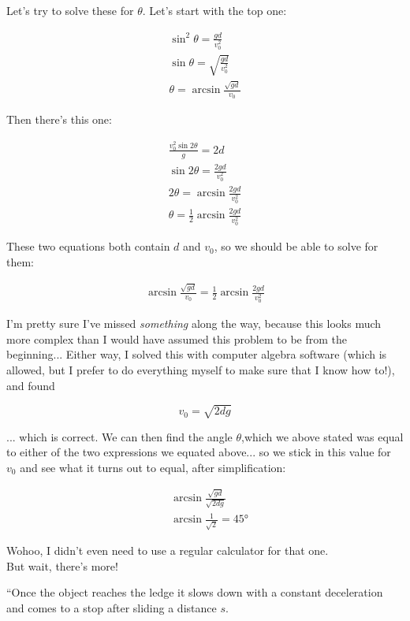\documentclass[8.01x]{subfiles}
\begin{document}
Let's try to solve these for $\theta$. Let's start with the top one:

\begin{align}
\sin^2 \theta = \frac{g d}{v_0^2}\\
\sin \theta = \sqrt{\frac{g d}{v_0^2}}\\
\theta = \arcsin \frac{\sqrt{g d}}{v_0}
\end{align}

Then there's this one:

\begin{align}
\frac{v_0^2 \sin 2\theta}{g} = 2d\\
\sin 2\theta = \frac{2 g d}{v_0^2}\\
2\theta = \arcsin \frac{2 g d}{v_0^2}\\
\theta = \frac{1}{2} \arcsin \frac{2 g d}{v_0^2}
\end{align}

These two equations both contain $d$ and $v_0$, so we should be able to solve for them:

\begin{align}
\arcsin \frac{\sqrt{g d}}{v_0} = \frac{1}{2} \arcsin \frac{2 g d}{v_0^2}
\end{align}

I'm pretty sure I've missed \emph{something} along the way, because this looks much more complex than I would have assumed this problem to be from the beginning... Either way, I solved this with computer algebra software (which is allowed, but I prefer to do everything myself to make sure that I know how to!), and found

\begin{equation}
v_0 = \sqrt{2 d g}
\end{equation}

... which is correct. We can then find the angle $\theta$,which we above stated was equal to either of the two expressions we equated above... so we stick in this value for $v_0$ and see what it turns out to equal, after simplification:

\begin{align}
&\arcsin \frac{\sqrt{g d}}{\sqrt{2 d g}}\\
&\arcsin \frac{1}{\sqrt{2}} = \ang{45}
\end{align}

Wohoo, I didn't even need to use a regular calculator for that one.\\
But wait, there's more!

``Once the object reaches the ledge it slows down with a constant deceleration and comes to a stop after sliding a distance $s$.
\end{document}
